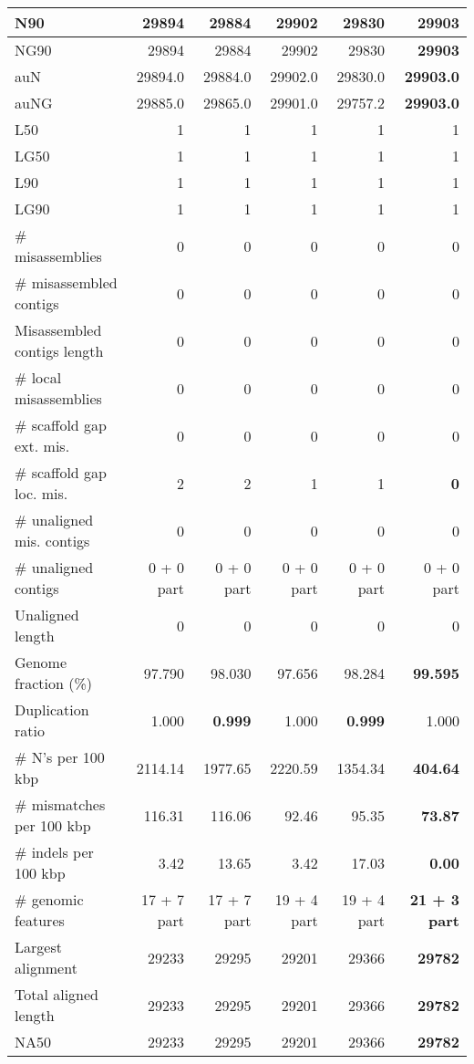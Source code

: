 \documentclass[12pt,a4paper]{article}
\begin{document}
\begin{table}[ht]
\begin{center}
\begin{tabular}{|l*{5}{|r}|}
N90 & 29894 & 29884 & 29902 & 29830 & {\bf 29903} \\ \hline
NG90 & 29894 & 29884 & 29902 & 29830 & {\bf 29903} \\ \hline
auN & 29894.0 & 29884.0 & 29902.0 & 29830.0 & {\bf 29903.0} \\ \hline
auNG & 29885.0 & 29865.0 & 29901.0 & 29757.2 & {\bf 29903.0} \\ \hline
L50 & 1 & 1 & 1 & 1 & 1 \\ \hline
LG50 & 1 & 1 & 1 & 1 & 1 \\ \hline
L90 & 1 & 1 & 1 & 1 & 1 \\ \hline
LG90 & 1 & 1 & 1 & 1 & 1 \\ \hline
\# misassemblies & 0 & 0 & 0 & 0 & 0 \\ \hline
\# misassembled contigs & 0 & 0 & 0 & 0 & 0 \\ \hline
Misassembled contigs length & 0 & 0 & 0 & 0 & 0 \\ \hline
\# local misassemblies & 0 & 0 & 0 & 0 & 0 \\ \hline
\# scaffold gap ext. mis. & 0 & 0 & 0 & 0 & 0 \\ \hline
\# scaffold gap loc. mis. & 2 & 2 & 1 & 1 & {\bf 0} \\ \hline
\# unaligned mis. contigs & 0 & 0 & 0 & 0 & 0 \\ \hline
\# unaligned contigs & 0 + 0 part & 0 + 0 part & 0 + 0 part & 0 + 0 part & 0 + 0 part \\ \hline
Unaligned length & 0 & 0 & 0 & 0 & 0 \\ \hline
Genome fraction (\%) & 97.790 & 98.030 & 97.656 & 98.284 & {\bf 99.595} \\ \hline
Duplication ratio & 1.000 & {\bf 0.999} & 1.000 & {\bf 0.999} & 1.000 \\ \hline
\# N's per 100 kbp & 2114.14 & 1977.65 & 2220.59 & 1354.34 & {\bf 404.64} \\ \hline
\# mismatches per 100 kbp & 116.31 & 116.06 & 92.46 & 95.35 & {\bf 73.87} \\ \hline
\# indels per 100 kbp & 3.42 & 13.65 & 3.42 & 17.03 & {\bf 0.00} \\ \hline
\# genomic features & 17 + 7 part & 17 + 7 part & 19 + 4 part & 19 + 4 part & {\bf 21 + 3 part} \\ \hline
Largest alignment & 29233 & 29295 & 29201 & 29366 & {\bf 29782} \\ \hline
Total aligned length & 29233 & 29295 & 29201 & 29366 & {\bf 29782} \\ \hline
NA50 & 29233 & 29295 & 29201 & 29366 & {\bf 29782} \\ \hline

\end{tabular}
\end{center}
\end{table}
\end{document}
